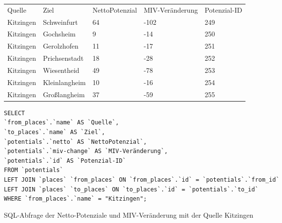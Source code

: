 \begin{tabularx}{\textwidth}{*5{X}}
Quelle & Ziel & NettoPotenzial & MIV-Veränderung & Potenzial-ID\\ 
Kitzingen & Schweinfurt & 64 & -102 & 249\\ 
Kitzingen & Gochsheim & 9 & -14 & 250\\ 
Kitzingen & Gerolzhofen & 11 & -17 & 251\\ 
Kitzingen & Prichsenstadt & 18 & -28 & 252\\ 
Kitzingen & Wiesentheid & 49 & -78 & 253\\ 
Kitzingen & Kleinlangheim & 10 & -16 & 254\\ 
Kitzingen & Großlangheim & 37 & -59 & 255\\ 
\end{tabularx} 
\newline
\newline
\begin{listing}[htbp]
\begin{verbatim}
SELECT
`from_places`.`name` AS `Quelle`, 
`to_places`.`name` AS `Ziel`, 
`potentials`.`netto` AS `NettoPotenzial`, 
`potentials`.`miv-change` AS `MIV-Veränderung`, 
`potentials`.`id` AS `Potenzial-ID`
FROM `potentials`
LEFT JOIN `places` `from_places` ON `from_places`.`id` = `potentials`.`from_id`
LEFT JOIN `places` `to_places` ON `to_places`.`id` = `potentials`.`to_id`
WHERE `from_places`.`name` = "Kitzingen";
\end{verbatim}
\caption{SQL-Abfrage der Netto-Potenziale und MIV-Veränderung mit der Quelle Kitzingen}\label{lst-fz-kitzingen}
\end{listing}